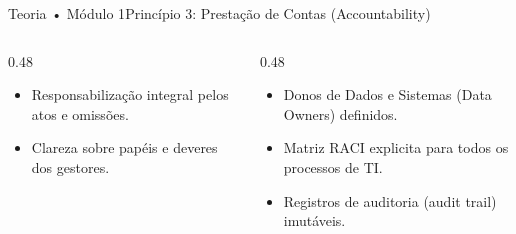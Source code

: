 \begin{senaiframe}{Teoria • Módulo 1}{Princípio 3: Prestação de Contas (Accountability)}
  \begin{columns}[t]
    \begin{column}{0.48\textwidth}
      \begin{tcolorbox}[senaibluecard, title={Conceito do IBGC}]
        \begin{itemize}
          \item Responsabilização integral pelos atos e omissões.
          \item Clareza sobre papéis e deveres dos gestores.
        \end{itemize}
      \end{tcolorbox}
    \end{column}
    \begin{column}{0.48\textwidth}
      \begin{tcolorbox}[senaicard, title={Aplicação Prática na TI}]
        \begin{itemize}
          \item Donos de Dados e Sistemas (Data Owners) definidos.
          \item Matriz RACI explicita para todos os processos de TI.
          \item Registros de auditoria (audit trail) imutáveis.
        \end{itemize}
      \end{tcolorbox}
    \end{column}
  \end{columns}
\end{senaiframe}

